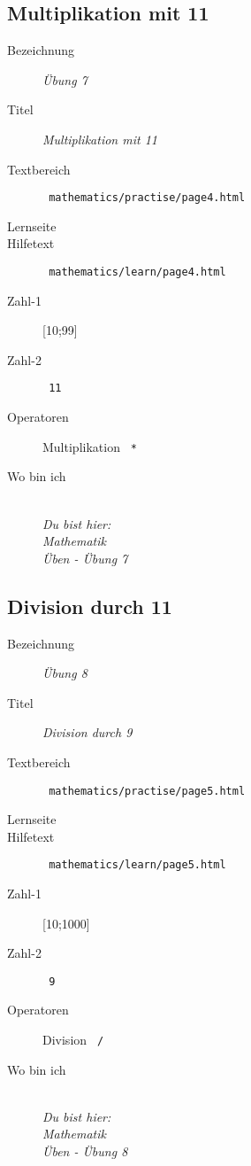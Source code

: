 \subsection{ Multiplikation mit 11 }
\label{cha:math-practise-page8}
\begin{description}
  \item[Bezeichnung] \emph{ Übung 7 }
  \item[Titel] \emph{ Multiplikation mit 11 }
  \item[Textbereich] \texttt{ mathematics/practise/page4.html }
  \item[Lernseite] 
  \item[Hilfetext] \texttt{ mathematics/learn/page4.html }
  \item[Zahl-1] [10;99]
  \item[Zahl-2] \texttt{ 11 }
  \item[Operatoren] Multiplikation \texttt{ * }
  \item[Wo bin ich] \emph{\\Du bist hier:\\Mathematik\\Üben - Übung 7}
\end{description}




\subsection{ Division durch 11 }
\label{cha:math-practise-page9}
\begin{description}
  \item[Bezeichnung] \emph{ Übung 8 }
  \item[Titel] \emph{ Division durch 9 }
  \item[Textbereich] \texttt{ mathematics/practise/page5.html }
  \item[Lernseite] 
  \item[Hilfetext] \texttt{ mathematics/learn/page5.html }
  \item[Zahl-1] [10;1000]
  \item[Zahl-2] \texttt{ 9 }
  \item[Operatoren] Division \texttt{ / }
  \item[Wo bin ich] \emph{\\Du bist hier:\\Mathematik\\Üben - Übung 8}
\end{description}
